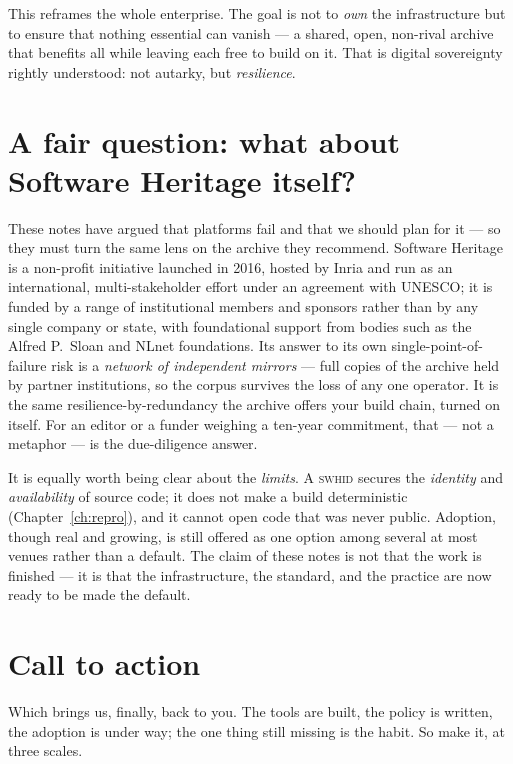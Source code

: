 This reframes the whole enterprise. The goal is not to \emph{own} the infrastructure but to ensure
that nothing essential can vanish --- a shared, open, non-rival archive that benefits all while
leaving each free to build on it. That is digital sovereignty rightly understood: not autarky, but
\emph{resilience}.

\section{A fair question: what about Software Heritage itself?}

These notes have argued that platforms fail and that we should plan for it --- so they must turn the same
lens on the archive they recommend. Software Heritage is a non-profit initiative launched in 2016,
hosted by Inria and run as an international, multi-stakeholder effort under an agreement with UNESCO;
it is funded by a range of institutional members and sponsors rather than by any single company or
state, with foundational support from bodies such as the Alfred P.\ Sloan and NLnet foundations. Its
answer to its own single-point-of-failure risk is a \emph{network of independent mirrors} --- full
copies of the archive held by partner institutions, so the corpus survives the loss of any one
operator. It is the same resilience-by-redundancy the archive offers your build chain, turned on
itself. For an editor or a funder weighing a ten-year commitment, that --- not a metaphor --- is the
due-diligence answer.

It is equally worth being clear about the \emph{limits}. A \textsc{swhid} secures the \emph{identity}
and \emph{availability} of source code; it does not make a build deterministic
(Chapter~\ref{ch:repro}), and it cannot open code that was never public. Adoption, though real and
growing, is still offered as one option among several at most venues rather than a default. The
claim of these notes is not that the work is finished --- it is that the infrastructure, the standard,
and the practice are now ready to be made the default.

\section{Call to action}

Which brings us, finally, back to you. The tools are built, the policy is written, the adoption is
under way; the one thing still missing is the habit. So make it, at three scales.

